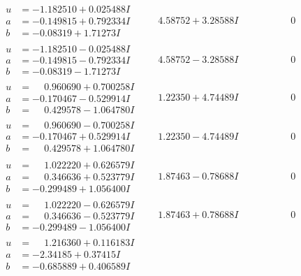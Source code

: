 \documentclass[1p]{elsarticle_modified}
\theoremstyle{definition}
\begin{document}
$$\begin{array}{c|c|c}
\begin{aligned}
u &= -1.182510 + 0.025488 I \\
a &= -0.149815 + 0.792334 I \\
b &= -0.08319 + 1.71273 I\end{aligned}
 & \phantom{-}4.58752 + 3.28588 I & \phantom{-0.000000 } 0 \\ \hline\begin{aligned}
u &= -1.182510 - 0.025488 I \\
a &= -0.149815 - 0.792334 I \\
b &= -0.08319 - 1.71273 I\end{aligned}
 & \phantom{-}4.58752 - 3.28588 I & \phantom{-0.000000 } 0 \\ \hline\begin{aligned}
u &= \phantom{-}0.960690 + 0.700258 I \\
a &= -0.170467 - 0.529914 I \\
b &= \phantom{-}0.429578 - 1.064780 I\end{aligned}
 & \phantom{-}1.22350 + 4.74489 I & \phantom{-0.000000 } 0 \\ \hline\begin{aligned}
u &= \phantom{-}0.960690 - 0.700258 I \\
a &= -0.170467 + 0.529914 I \\
b &= \phantom{-}0.429578 + 1.064780 I\end{aligned}
 & \phantom{-}1.22350 - 4.74489 I & \phantom{-0.000000 } 0 \\ \hline\begin{aligned}
u &= \phantom{-}1.022220 + 0.626579 I \\
a &= \phantom{-}0.346636 + 0.523779 I \\
b &= -0.299489 + 1.056400 I\end{aligned}
 & \phantom{-}1.87463 - 0.78688 I & \phantom{-0.000000 } 0 \\ \hline\begin{aligned}
u &= \phantom{-}1.022220 - 0.626579 I \\
a &= \phantom{-}0.346636 - 0.523779 I \\
b &= -0.299489 - 1.056400 I\end{aligned}
 & \phantom{-}1.87463 + 0.78688 I & \phantom{-0.000000 } 0 \\ \hline\begin{aligned}
u &= \phantom{-}1.216360 + 0.116183 I \\
a &= -2.34185 + 0.37415 I \\
b &= -0.685889 + 0.406589 I\end{aligned}

\end{array}$$
\end{document}
